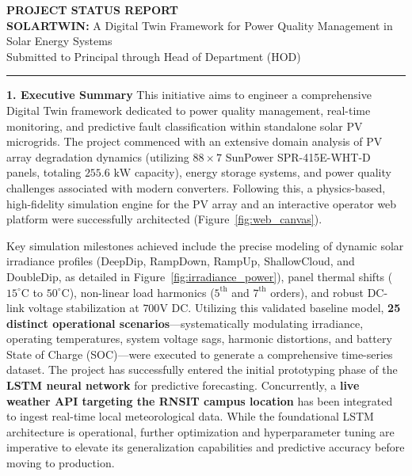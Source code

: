 \documentclass[11pt,a4paper]{article}
\newcommand{\sectionheader}[1]{\vspace{10pt}\noindent\Large\textbf{#1}\vspace{4pt}\normalsize}
\begin{document}
\begin{center}
    \vspace*{2ex}
    \textbf{\huge PROJECT STATUS REPORT}\\[6pt]
    \Large \textbf{SOLARTWIN:} A Digital Twin Framework for Power Quality Management in Solar Energy Systems\\[6pt]
    \large Submitted to Principal through Head of Department (HOD)
    \vspace*{2ex}
    \rule{\textwidth}{0.8pt}
\end{center}

\vspace{-5pt}

\sectionheader{1. Executive Summary}
\vspace{2pt}
\noindent This initiative aims to engineer a comprehensive Digital Twin framework dedicated to power quality management, real-time monitoring, and predictive fault classification within standalone solar PV microgrids. The project commenced with an extensive domain analysis of PV array degradation dynamics (utilizing $88 \times 7$ SunPower SPR-415E-WHT-D panels, totaling $255.6\text{ kW}$ capacity), energy storage systems, and power quality challenges associated with modern converters. Following this, a physics-based, high-fidelity simulation engine for the PV array and an interactive operator web platform were successfully architected (Figure~\ref{fig:web_canvas}). 

Key simulation milestones achieved include the precise modeling of dynamic solar irradiance profiles (DeepDip, RampDown, RampUp, ShallowCloud, and DoubleDip, as detailed in Figure~\ref{fig:irradiance_power}), panel thermal shifts ($15^\circ\text{C}$ to $50^\circ\text{C}$), non-linear load harmonics ($5^{\text{th}}$ and $7^{\text{th}}$ orders), and robust DC-link voltage stabilization at $700\text{V DC}$. Utilizing this validated baseline model, \textbf{25 distinct operational scenarios}---systematically modulating irradiance, operating temperatures, system voltage sags, harmonic distortions, and battery State of Charge (SOC)---were executed to generate a comprehensive time-series dataset. The project has successfully entered the initial prototyping phase of the \textbf{LSTM neural network} for predictive forecasting. Concurrently, a \textbf{live weather API targeting the RNSIT campus location} has been integrated to ingest real-time local meteorological data. While the foundational LSTM architecture is operational, further optimization and hyperparameter tuning are imperative to elevate its generalization capabilities and predictive accuracy before moving to production.
\end{document}
